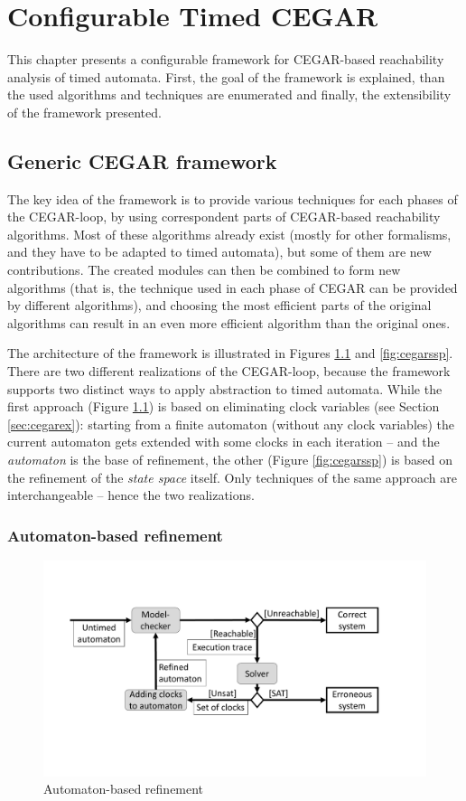 \chapter{Configurable Timed CEGAR} \label{chap:timed_cegar}

This chapter presents a configurable framework for CEGAR-based reachability analysis of timed automata. First, the goal of the framework is explained, than the used algorithms and techniques are enumerated and finally, the extensibility of the framework presented. 

\section{Generic CEGAR framework}

The key idea of the framework is to provide various techniques for each phases of the CEGAR-loop, by using correspondent parts of CEGAR-based reachability algorithms. Most of these algorithms already exist (mostly for other formalisms, and they have to be adapted to timed automata), but some of them are new contributions. The created modules can then be combined to form new algorithms (that is, the technique used in each phase of CEGAR can be provided by different algorithms), and choosing the most efficient parts of the original algorithms can result in an even more efficient algorithm than the original ones. 

The architecture of the framework is illustrated in Figures \ref{fig:cegaraut} and \ref{fig:cegarssp}. There are two different realizations of the CEGAR-loop, because the framework supports two distinct ways to apply abstraction to timed automata. While the first approach (Figure \ref{fig:cegaraut}) is based on eliminating clock variables (see Section \ref{sec:cegarex}):  starting from a finite automaton (without any clock variables) the current automaton gets extended with some clocks in each iteration -- and the \emph{automaton} is the base of refinement, the other (Figure \ref{fig:cegarssp}) is based on the refinement of the \emph{state space} itself. Only techniques of the same approach are interchangeable -- hence the two realizations.

\subsection{Automaton-based refinement}

\begin{figure} 
	\centering
	\includegraphics[width=.7\textwidth]{include/figures/alg_arch_ta}%
	\caption{Automaton-based refinement}%
	\label{fig:cegaraut}%
\end{figure}

